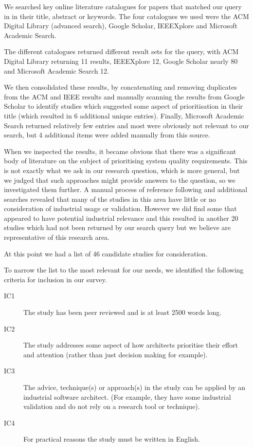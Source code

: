 We searched key online literature catalogues for papers that matched our query in in their title, abstract or keywords.  The four catalogues we used were the ACM Digital Library (advanced search), Google Scholar, IEEEXplore and Microsoft Academic Search.

The different catalogues returned different result sets for the query, with ACM Digital Library returning 11 results, IEEEXplore 12, Google Scholar nearly 80 and Microsoft Academic Search 12.

We then consolidated these results, by concatenating and removing duplicates from the ACM and IEEE results and manually scanning the results from Google Scholar to identify studies which suggested some aspect of prioritisation in their title (which resulted in 6 additional unique entries).  Finally, Microsoft Academic Search returned relatively few entries and most were obviously not relevant to our search, but 4 additional items were added manually from this source.

When we inspected the results, it became obvious that there was a significant body of literature on the subject of prioritising system quality requirements.  This is not exactly what we ask in our research question, which is more general, but we judged that such approaches might provide answers to the question, so we investigated them further.  A manual process of reference following and additional searches revealed that many of the studies in this area have little or no consideration of industrial usage or validation.  However we did find some that appeared to have potential industrial relevance and this resulted in another 20 studies which had not been returned by our search query but we believe are representative of this research area.

At this point we had a list of 46 candidate studies for consideration.

To narrow the list to the most relevant for our needs, we identified the following criteria for inclusion in our survey.

\begin{description}
	\item[IC1] The study has been peer reviewed and is at least 2500 words long.
	\item[IC2] The study addresses some aspect of how architects prioritise their effort and attention (rather than just decision making for example).
	\item[IC3] The advice, technique(s) or approach(s) in the study can be applied by an industrial software architect.  (For example, they have some industrial validation and do not rely on a research tool or technique).
	\item[IC4] For practical reasons the study must be written in English.
\end{description}

